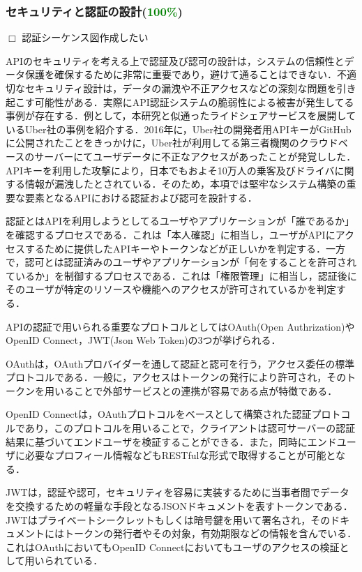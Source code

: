       \subsubsection{セキュリティと認証の設計(\textcolor{green}{100\%})}
        \label{sec:セキュリティと認証の設計}
          \par $\Box$ 認証シーケンス図作成したい
          \par APIのセキュリティを考える上で認証及び認可の設計は，システムの信頼性とデータ保護を確保するために非常に重要であり，避けて通ることはできない．不適切なセキュリティ設計は，データの漏洩や不正アクセスなどの深刻な問題を引き起こす可能性がある．実際にAPI認証システムの脆弱性による被害が発生してる事例が存在する．例として，本研究と似通ったライドシェアサービスを展開しているUber社の事例を紹介する．2016年に，Uber社の開発者用APIキーがGitHubに公開されたことをきっかけに，Uber社が利用してる第三者機関のクラウドベースのサーバーにてユーザデータに不正なアクセスがあったことが発覚しした．APIキーを利用した攻撃により，日本でもおよそ10万人の乗客及びドライバに関する情報が漏洩したとされている．そのため，本項では堅牢なシステム構築の重要な要素となるAPIにおける認証および認可を設計する．
          \par 認証とはAPIを利用しようとしてるユーザやアプリケーションが「誰であるか」を確認するプロセスである．これは「本人確認」に相当し，ユーザがAPIにアクセスするために提供したAPIキーやトークンなどが正しいかを判定する．一方で，認可とは認証済みのユーザやアプリケーションが「何をすることを許可されているか」を制御するプロセスである．これは「権限管理」に相当し，認証後にそのユーザが特定のリソースや機能へのアクセスが許可されているかを判定する．
          \par APIの認証で用いられる重要なプロトコルとしてはOAuth(Open Authrization)やOpenID Connect，JWT(Json Web Token)の3つが挙げられる．
          \par OAuthは，OAuthプロバイダーを通して認証と認可を行う，アクセス委任の標準プロトコルである．一般に，アクセスはトークンの発行により許可され，そのトークンを用いることで外部サービスとの連携が容易である点が特徴である．
          \par OpenID Connectは，OAuthプロトコルをベースとして構築された認証プロトコルであり，このプロトコルを用いることで，クライアントは認可サーバーの認証結果に基づいてエンドユーザを検証することができる．また，同時にエンドユーザに必要なプロフィール情報などもRESTfulな形式で取得することが可能となる．
          \par JWTは，認証や認可，セキュリティを容易に実装するために当事者間でデータを交換するための軽量な手段となるJSONドキュメントを表すトークンである．JWTはプライベートシークレットもしくは暗号鍵を用いて署名され，そのドキュメントにはトークンの発行者やその対象，有効期限などの情報を含んでいる．これはOAuthにおいてもOpenID Connectにおいてもユーザのアクセスの検証として用いられている．
